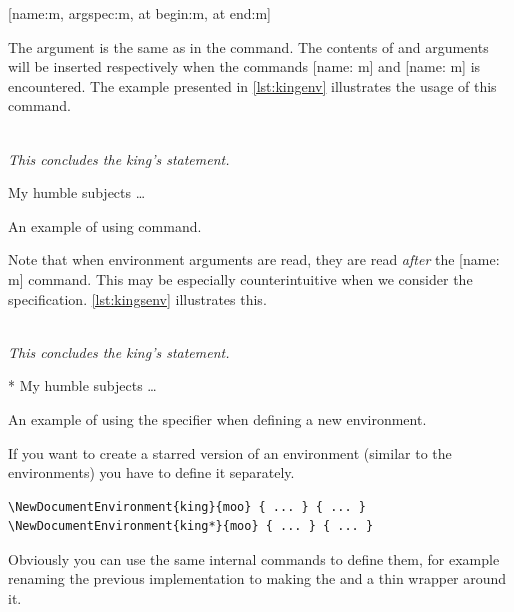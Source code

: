 \begin{lscommand}
  \small
  [name:m, argspec:m, at begin:m, at end:m]
\end{lscommand}
The  argument is the same as in the
 command. The contents of  and  arguments will be inserted respectively when the commands
[name: m] and [name: m] is encountered. The example
presented in \autoref{lst:kingenv} illustrates the usage of this command.
\begin{listing}
  \begin{example}
 {%
  \\[1em]%
  \emph{This concludes
    the king's statement.}%
}

\begin{king}
My humble subjects \ldots
\end{king}
\end{example}
  \caption{An example of using 
    command.}\label{lst:kingenv}
\end{listing}

Note that when environment arguments are read, they are read \emph{after} the
[name: m] command. This may be especially counterintuitive when we
consider the  specification. \autoref{lst:kingsenv} illustrates this.
\begin{listing}
  \begin{example}
 {%
  \\[1em]%
  \emph{This concludes
    the king's statement.}%
}

\begin{king}*
My humble subjects \ldots
\end{king}
\end{example}
  \caption{An example of using the  specifier when defining a new
    environment.}\label{lst:kingsenv}
\end{listing}
If you want to create a starred version of an environment (similar to the
 environments) you have to define it separately.
\begin{verbatim}
\NewDocumentEnvironment{king}{moo} { ... } { ... }
\NewDocumentEnvironment{king*}{moo} { ... } { ... }
\end{verbatim}
Obviously you can use the same internal commands to define them, for example
renaming the previous implementation to  making the
 and  a thin wrapper around it.


